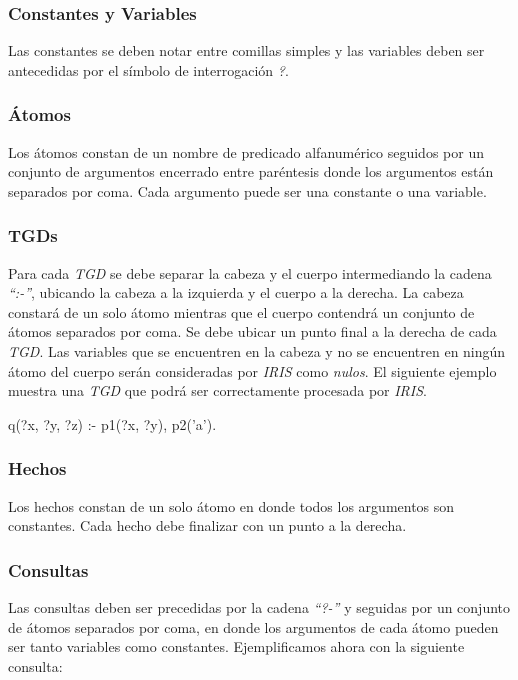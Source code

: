 \documentclass[11pt,a4paper,twoside]{tesis}
\begin{document}
\subsubsection{Constantes y Variables}
Las constantes se deben notar entre comillas simples y las variables deben ser antecedidas por el símbolo de interrogación \textit{?}.

\subsubsection{Átomos}
Los átomos constan de un nombre de predicado alfanumérico seguidos por un conjunto de argumentos encerrado entre paréntesis donde los argumentos están separados por coma. Cada argumento puede ser una constante o una variable.

\subsubsection{TGDs}
Para cada \textit{TGD} se debe separar la cabeza y el cuerpo intermediando la cadena \textit{``:-''}, ubicando la cabeza a la izquierda y el cuerpo a la derecha. La cabeza constará de un solo átomo mientras que el cuerpo contendrá un conjunto de átomos separados por coma. Se debe ubicar un punto final a la derecha de cada \textit{TGD}. Las variables que se encuentren en la cabeza y no se encuentren en ningún átomo del cuerpo serán consideradas por \textit{IRIS} como \textit{nulos}.   El siguiente ejemplo muestra una \textit{TGD} que podrá ser correctamente procesada por \textit{IRIS}.

\begin{center}
    q(?x, ?y, ?z) :- p1(?x, ?y), p2('a').
\end{center} 

\subsubsection{Hechos}
Los hechos constan de un solo átomo en donde todos los argumentos son constantes. Cada hecho debe finalizar con un punto a la derecha.

\subsubsection{Consultas}\label{consultas_iris}
Las consultas deben ser precedidas por la cadena \textit{``?-''} y seguidas por un conjunto de átomos separados por coma, en donde los argumentos de cada átomo pueden ser tanto variables como constantes. Ejemplificamos ahora con la siguiente consulta:
\end{document}

